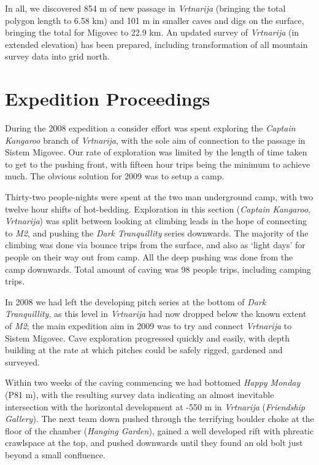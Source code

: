 In all, we discovered 854 m of new passage in \emph{Vrtnarija} (bringing
the total polygon length to 6.58 km) and 101 m in smaller caves and digs
on the surface, bringing the total for Migovec to 22.9 km. An updated
survey of \emph{Vrtnarija} (in extended elevation) has been prepared,
including transformation of all mountain survey data into grid north.

\hypertarget{expedition-proceedings}{%
\section{Expedition Proceedings}\label{expedition-proceedings}}

During the 2008 expedition a consider effort was spent exploring the
\emph{Captain Kangaroo} branch of \emph{Vrtnarija}, with the sole aim of
connection to the passage in Sistem Migovec. Our rate of exploration was
limited by the length of time taken to get to the pushing front, with
fifteen hour trips being the minimum to achieve much. The obvious
solution for 2009 was to setup a camp.

Thirty-two people-nights were spent at the two man underground camp,
with two twelve hour shifts of hot-bedding. Exploration in this section
(\emph{Captain Kangaroo}, \emph{Vrtnarija}) was split between looking at
climbing leads in the hope of connecting to \emph{M2}, and pushing the
\emph{Dark Tranquillity} series downwards. The majority of the climbing
was done via bounce trips from the surface, and also as `light days' for
people on their way out from camp. All the deep pushing was done from
the camp downwards. Total amount of caving was 98 people trips,
including camping trips.

In 2008 we had left the developing pitch series at the bottom of
\emph{Dark Tranquillity}, as this level in \emph{Vrtnarija} had now
dropped below the known extent of \emph{M2}; the main expedition aim in
2009 was to try and connect \emph{Vrtnarija} to Sistem Migovec. Cave
exploration progressed quickly and easily, with depth building at the
rate at which pitches could be safely rigged, gardened and surveyed.

Within two weeks of the caving commencing we had bottomed \emph{Happy
Monday} (P81 m), with the resulting survey data indicating an almost
inevitable intersection with the horizontal development at -550 m in
\emph{Vrtnarija} (\emph{Friendship Gallery}). The next team down pushed
through the terrifying boulder choke at the floor of the chamber
(\emph{Hanging Garden}), gained a well developed rift with phreatic
crawlspace at the top, and pushed downwards until they found an old bolt
just beyond a small confluence.


